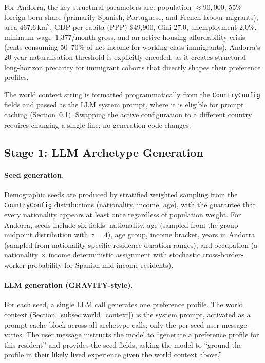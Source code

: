 \documentclass[a4paper,12pt]{article}
\begin{document}
For Andorra, the key structural parameters are: population $\approx 90{,}000$,
55\% foreign-born share (primarily Spanish, Portuguese, and French labour
migrants), area 467.6\,km$^2$, GDP per capita (PPP) \$49{,}900, Gini 27.0,
unemployment 2.0\%, minimum wage \EUR\,1{,}377/month gross, and an active
housing affordability crisis (rents consuming 50--70\% of net income for
working-class immigrants). Andorra's 20-year naturalisation threshold is
explicitly encoded, as it creates structural long-horizon precarity for
immigrant cohorts that directly shapes their preference profiles.

The world context string is formatted programmatically from the
\texttt{CountryConfig} fields and passed as the LLM system prompt, where
it is eligible for prompt caching (Section~\ref{subsec:archetype_generation}).
Swapping the active configuration to a different country requires changing
a single line; no generation code changes.

\subsection{Stage 1: LLM Archetype Generation}
\label{subsec:archetype_generation}

\paragraph{Seed generation.}
Demographic seeds are produced by stratified weighted sampling from the
\texttt{CountryConfig} distributions (nationality, income, age), with the
guarantee that every nationality appears at least once regardless of
population weight. For Andorra, seeds include six fields: nationality,
age (sampled from the group midpoint distribution with $\sigma = 4$), age
group, income bracket, years in Andorra (sampled from nationality-specific
residence-duration ranges), and occupation (a nationality $\times$ income
deterministic assignment with stochastic cross-border-worker probability
for Spanish mid-income residents).

\paragraph{LLM generation (GRAVITY-style).}
For each seed, a single LLM call generates one preference profile. The
world context (Section~\ref{subsec:world_context}) is the system prompt,
activated as a prompt cache block across all archetype calls; only the
per-seed user message varies. The user message instructs the model to
``generate a preference profile for this resident'' and provides the seed
fields, asking the model to ``ground the profile in their likely lived
experience given the world context above.''
\end{document}
